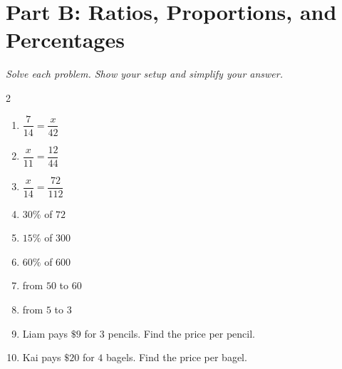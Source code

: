 \documentclass[11pt]{article}
\begin{document}
\section*{Part B: Ratios, Proportions, and Percentages}
\noindent\textit{Solve each problem. Show your setup and simplify your answer.}
\begin{multicols}{2}
\begin{enumerate}
  \item $\dfrac{7}{14} = \dfrac{x}{42}$
  \vspace{1.4cm}
  \item $\dfrac{x}{11} = \dfrac{12}{44}$
  \vspace{1.4cm}
  \item $\dfrac{x}{14} = \dfrac{72}{112}$
  \vspace{1.4cm}
  \item $30\%$ of $72$
  \vspace{1.4cm}
  \item $15\%$ of $300$
  \vspace{1.4cm}
  \item $60\%$ of $600$
  \vspace{1.4cm}
  \item from $50$ to $60$
  \vspace{1.4cm}
  \item from $5$ to $3$
  \vspace{1.4cm}
  \item Liam pays $\$9$ for $3$ pencils. Find the price per pencil.
  \vspace{1.4cm}
  \item Kai pays $\$20$ for $4$ bagels. Find the price per bagel.
  \vspace{1.4cm}
\end{enumerate}
\end{multicols}
\end{document}
